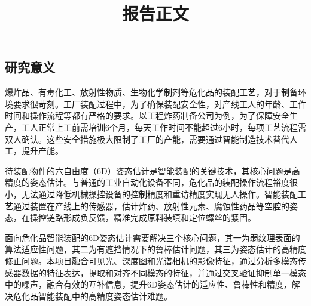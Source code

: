 \documentclass[12pt]{article}
\begin{document}

\title{报告正文}
\maketitle
\thispagestyle{empty}

\subsection{研究意义}

爆炸品、有毒化工、放射性物质、生物化学制剂等危化品的装配工艺，对于制备环境要求很苛刻。工厂装配过程中，为了确保装配安全性，对产线工人的年龄、工作时间和操作流程等都有严格的要求。以工程炸药制备公司为例，为了保障安全生产，工人正常上工前需培训6个月，每天工作时间不能超过6小时，每项工艺流程需双人确认。这些安全措施极大限制了工厂的产能，需要通过智能制造技术替代人工，提升产能。

待装配物件的六自由度（6D）姿态估计是智能装配的关键技术，其核心问题是高精度的姿态估计。与普通的工业自动化设备不同，危化品的装配操作流程裕度很小，无法通过降低机械操控设备的控制精度和重访精度实现无人操作。智能装配工艺通过装置在产线上的传感器，估计炸药、放射性元素、腐蚀性药品等空腔的姿态，在操控链路形成负反馈，精准完成原料装填和定位螺丝的紧固。

面向危化品智能装配的6D姿态估计需要解决三个核心问题，其一为弱纹理表面的算法适应性问题，其二为有遮挡情况下的鲁棒估计问题，其三为姿态估计的高精度修正问题。本项目融合可见光、深度图和光谱相机的影像特征，通过分析多模态传感器数据的特征表达，提取和对齐不同模态的特征，并通过交叉验证抑制单一模态中的噪声，融合有效的互补信息，提升6D姿态估计的适应性、鲁棒性和精度，解决危化品智能装配中的高精度姿态估计难题。
\end{document}
